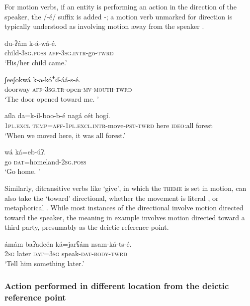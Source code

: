 \documentclass[output=paper]{langsci/langscibook}
\begin{document}
For motion verbs, if an entity is performing an action in the direction of the speaker, the /-é/ suffix is added -; a motion verb unmarked for direction is typically understood as involving motion away from the speaker . 

\ea\label{ex:ahlandc:29}
\gll
du-ʔám  k-á-wá-é. \\
child{}-\textsc{3sg.poss}  \textsc{aff-3sg.intr}{}-go-\textsc{twrd} \\
\glt
‘His/her child came.’
\z

\ea\label{ex:ahlandc:30}
\gll
ʃeeʃokwá  k-a-k\'{o}\textsf{ꜜ}ɗ{}-áá-s-é. \\
doorway  \textsc{aff-3sg.tr}{}-open-\textsc{mv-mouth-twrd} \\ 
\glt
‘The door opened toward me. ’
\z

\ea\label{ex:ahlandc:31}
\gll
aíla  da=k-íl-boo-b-é  nagá cét  hogí. \\
\textsc{1pl.excl}  \textsc{temp=aff-1pl.excl.intr}{}-move-\textsc{pst-twrd}  here  \textsc{ideo}:all  forest \\
\glt
‘When we moved here, it was all forest.’
\z

\ea\label{ex:ahlandc:32}
\gll
wá ká=eb-\'{u}ʔ.  \\
go  \textsc{dat}=homeland-\textsc{2sg.poss} \\
\glt
‘Go home. ’  
\z

Similarly, ditransitive verbs like ‘give’, in which the \textsc{theme} is set in motion, can also take the ‘toward’ directional, whether the movement is literal ,  or metaphorical . While most instances of the directional involve motion directed toward the speaker, the meaning in example  involves motion directed toward a third party, presumably as the deictic reference point.

\ea\label{ex:ahlandc:33}
\gll
ámám  baʔadeén  ká=jarʕám  nsam-ká-ts-é.  \\
\textsc{2sg}  later  \textsc{dat=3sg}  speak-\textsc{dat-body-twrd} \\
\glt
‘Tell him something later.’
\z


\subsubsection{Action performed in different location from the deictic reference point}\label{sec:ahlandc:4.6.2}
\end{document}
